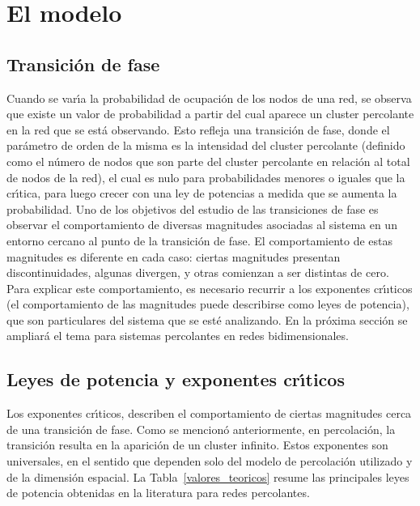 \documentclass[
 reprint,
 amsmath,amssymb,
 aps,
]{revtex4-1}
\begin{document}
\section{El modelo}

\subsection{Transici\'on de fase}

Cuando se var\'\i a la probabilidad de ocupaci\'on de los nodos de una red, se observa que existe un valor de probabilidad a partir del cual aparece un cluster percolante en la red que se est\'a observando. Esto refleja una transici\'on de fase, donde el par\'ametro de orden de la misma es la intensidad del cluster percolante (definido como el n\'umero de nodos que son parte del cluster percolante en relaci\'on al total de nodos de la red), el cual es nulo para probabilidades menores o iguales que la cr\'\i tica, para luego crecer con una ley de potencias a medida que se aumenta la probabilidad. Uno de los objetivos del estudio de las transiciones de fase es observar el comportamiento de diversas magnitudes asociadas al sistema en un entorno cercano al punto de la transici\'on de fase. El comportamiento de estas magnitudes es diferente en cada caso: ciertas magnitudes presentan discontinuidades, algunas divergen, y otras comienzan a ser distintas de cero. Para explicar este comportamiento, es necesario recurrir a los exponentes cr\'\i ıticos (el comportamiento de las magnitudes puede describirse como leyes de potencia), que son particulares del sistema que se est\'e analizando. En la pr\'oxima secci\'on se ampliar\'a el tema para sistemas percolantes en redes bidimensionales.

\subsection{\label{critical}Leyes de potencia y exponentes cr\'\i ticos}

Los exponentes cr\'\i ticos, describen el comportamiento de ciertas magnitudes cerca de una transici\'on de fase. Como se mencion\'o anteriormente, en percolaci\'on, la transici\'on resulta en la aparici\'on de un cluster infinito. Estos exponentes son universales, en el sentido que dependen solo del modelo de percolaci\'on utilizado y de la dimensi\'on espacial. La Tabla~\ref{valores_teoricos} resume las principales leyes de potencia obtenidas en la literatura para redes percolantes.
\end{document}
